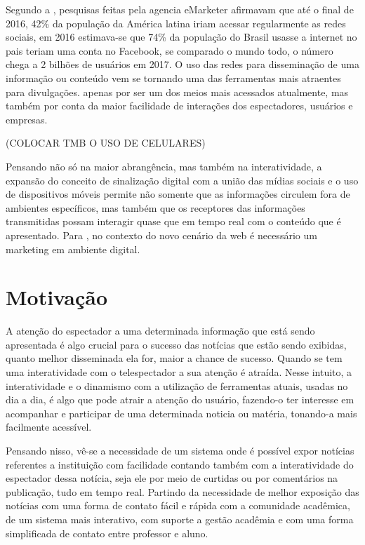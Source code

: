 Segundo a \cite{forbes2016}, pesquisas feitas pela agencia eMarketer afirmavam que até o final de 2016, 42\% da população da América latina iriam acessar regularmente as redes sociais, em 2016 estimava-se que 74\% da população do Brasil usasse a internet no pais teriam uma conta no Facebook, se comparado o mundo todo, o número chega a 2 bilhões de usuários em 2017. O uso das redes para disseminação de uma informação ou conteúdo vem se tornando uma das ferramentas mais atraentes para divulgações. apenas por ser um dos meios mais acessados atualmente, mas também por conta da maior facilidade de interações dos espectadores, usuários e empresas. 

(COLOCAR TMB O USO DE CELULARES)

Pensando não só na maior abrangência, mas também na interatividade, a expansão do conceito de sinalização digital com a união das mídias sociais e o uso de dispositivos móveis permite não somente que as informações circulem fora de ambientes específicos, mas também que os receptores das informações transmitidas possam interagir quase que em tempo real com o conteúdo que é apresentado. Para \cite{santos2014}, no contexto do novo cenário da web é necessário um marketing em ambiente digital.

\section{Motivação}
A atenção do espectador a uma determinada informação que está sendo apresentada é algo crucial para o sucesso das notícias que estão sendo exibidas, quanto melhor disseminada ela for, maior a chance de sucesso. Quando se tem uma interatividade com o telespectador a sua atenção é atraída. Nesse intuito, a interatividade e o dinamismo com a utilização de ferramentas atuais, usadas no dia a dia, é algo que pode atrair a atenção do usuário, fazendo-o ter interesse em acompanhar e participar de uma determinada noticia ou matéria, tonando-a mais facilmente acessível. 

Pensando nisso, vê-se a necessidade de um sistema onde é possível expor notícias referentes a instituição com facilidade contando também com a interatividade do espectador dessa notícia, seja ele por meio de curtidas ou por comentários na publicação, tudo em tempo real. Partindo da necessidade de melhor exposição das notícias com uma forma de contato fácil e rápida com a comunidade acadêmica, de um sistema mais interativo, com suporte a gestão acadêmia e com uma forma simplificada de contato entre professor e aluno. 

